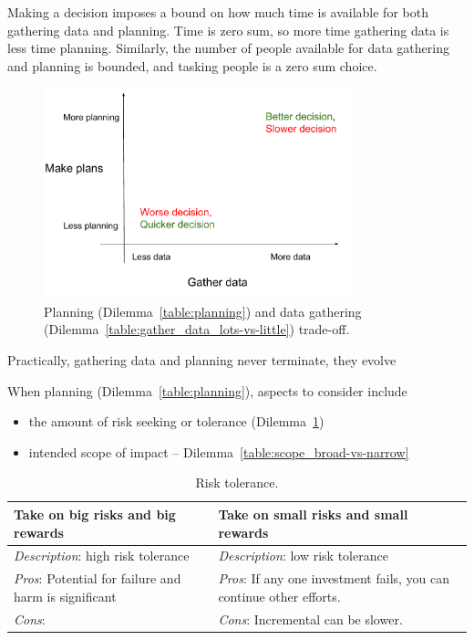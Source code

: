 Making a decision imposes a bound on how much time is available for both gathering data and planning. Time is zero sum, so more time gathering data is less time planning. Similarly, the number of people available for data gathering and planning is bounded, and tasking people is a zero sum choice.

\begin{figure}[ht]
    \centering
    \includegraphics[width=0.8\textwidth]{images/planning_and_data_gathering.pdf}
    \caption{Planning (Dilemma~\ref{table:planning}) and data gathering (Dilemma~\ref{table:gather_data_lots-vs-little}) trade-off.}
    \label{fig:pareto_frontier}
\end{figure}

Practically, gathering data and planning never terminate, they evolve 




When planning (Dilemma~\ref{table:planning}), aspects to consider include
\begin{itemize}
    \item the amount of risk seeking or tolerance (Dilemma~\ref{table:risk})
    \item intended scope of impact -- Dilemma~\ref{table:scope_broad-vs-narrow}
\end{itemize}

\begin{center}
\begin{table}[ht]
\begin{tabular}{ | m{\dilemmatablewidth}| m{\dilemmatablewidth} | } 
  \hline
  \textbf{Take on big risks and big rewards} & 
  \textbf{Take on small risks and small rewards} \\ 
  \hline
  \textit{Description}: high risk tolerance &
  \textit{Description}: low risk tolerance \\
  \hline
  \textit{Pros}: Potential for failure and harm is significant &
  \textit{Pros}: If any one investment fails, you can continue other efforts. \\
  \hline
  \textit{Cons}:  & 
  \textit{Cons}: Incremental can be slower. \\
  \hline
\end{tabular}
\caption{Risk tolerance. 
}
\label{table:risk}
\end{table}
\end{center}

